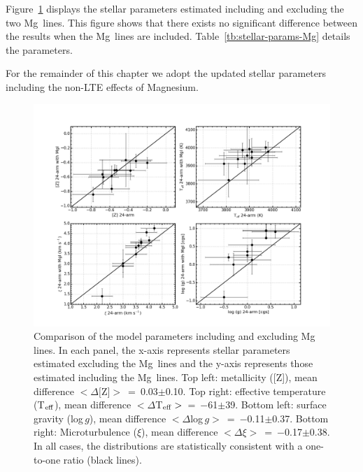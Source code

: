 
Figure~\ref{fig:24ATvs24Mg} displays the stellar parameters estimated including and excluding the two Mg\,\1 lines.
This figure shows that there exists no significant difference between the results when the Mg\,\1 lines are included.
Table~\ref{tb:stellar-params-Mg} details the parameters.

For the remainder of this chapter we adopt the updated stellar parameters including the non-LTE effects of Magnesium.

\begin{figure}
 \centering
 \begin{center}
  \centering
  \includegraphics[width=\textwidth]{ngc6822/N6822-Mg-compare}
 \end{center}
 \caption[Best-fit parameter comparison using including and excluding Mg\,\1]{
            Comparison of the model parameters including and excluding Mg\,\1 lines.
            In each panel, the x-axis represents stellar parameters estimated excluding the Mg\,\1 lines
            and the y-axis represents those estimated including the Mg\,\1 lines.
            Top left: metallicity ([Z]), mean difference
            $<\Delta[$Z$]>$~=~0.03$\pm$0.10.
            Top right: effective temperature (T$_{\rm eff}$), mean difference
            $<\Delta$T$_{\rm eff}>$~=~$-$61$\pm$39.
            Bottom left: surface gravity (log\,$g$), mean difference
            $<\Delta$log\,$g>$~=~$-$0.11$\pm$0.37.
            Bottom right: Microturbulence ($\xi$), mean difference
            $<\Delta \xi>$~=~$-$0.17$\pm$0.38.
            In all cases, the distributions are statistically consistent with a one-to-one ratio (black lines).
          }
 \label{fig:24ATvs24Mg}
\end{figure}


